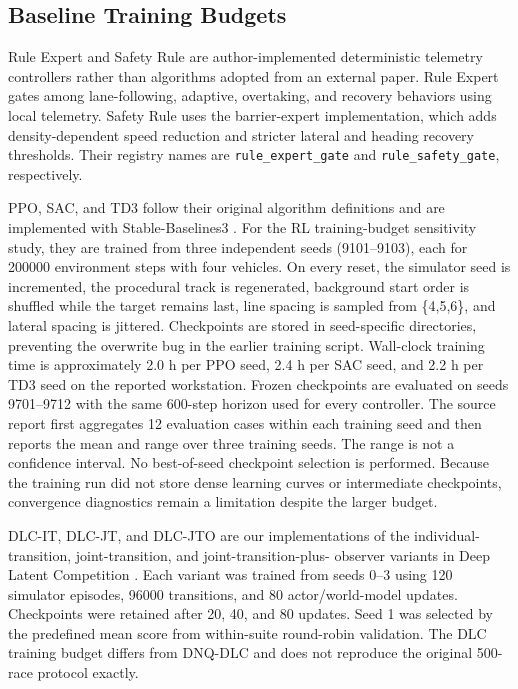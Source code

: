 \documentclass[journal]{IEEEtran}
\begin{document}
\subsection{Baseline Training Budgets}
\label{supp:baseline_training}

Rule Expert and Safety Rule are author-implemented deterministic
telemetry controllers rather than algorithms adopted from an external
paper. Rule Expert gates among lane-following, adaptive, overtaking, and
recovery behaviors using local telemetry. Safety Rule uses the
barrier-expert implementation, which adds density-dependent speed
reduction and stricter lateral and heading recovery thresholds. Their
registry names are \texttt{rule\_expert\_gate} and
\texttt{rule\_safety\_gate}, respectively.

PPO, SAC, and TD3 follow their original algorithm definitions
\cite{schulman2017ppo,haarnoja2018sac,fujimoto2018td3} and are
implemented with Stable-Baselines3 \cite{raffin2021sb3}. For the RL
training-budget sensitivity study, they are trained from three
independent seeds (9101--9103), each for 200000
environment steps with four vehicles. On every reset, the simulator
seed is incremented, the procedural track is regenerated, background
start order is shuffled while the target remains last, line spacing is
sampled from \{4,5,6\}, and lateral spacing is jittered. Checkpoints are
stored in seed-specific directories, preventing the overwrite bug in
the earlier training script. Wall-clock training time is approximately
2.0 h per PPO seed, 2.4 h per SAC seed, and 2.2 h per TD3 seed on the
reported workstation. Frozen checkpoints are evaluated on seeds
9701--9712 with the same 600-step horizon used for every controller.
The source report first aggregates 12 evaluation cases within each
training seed and then reports the mean and range over three training
seeds. The range is not a confidence interval. No best-of-seed
checkpoint selection is performed. Because the training run did not
store dense learning curves or intermediate checkpoints, convergence
diagnostics remain a limitation despite the larger budget.

DLC-IT, DLC-JT, and DLC-JTO are our implementations of the
individual-transition, joint-transition, and joint-transition-plus-
observer variants in Deep Latent Competition
\cite{schwarting2021dlc}. Each variant was trained from seeds 0--3 using
120 simulator episodes, 96000 transitions, and 80 actor/world-model
updates. Checkpoints were retained after 20, 40, and 80 updates. Seed 1
was selected by the predefined mean score from within-suite round-robin
validation. The DLC training budget differs from DNQ-DLC and does not
reproduce the original 500-race protocol exactly.
\end{document}

